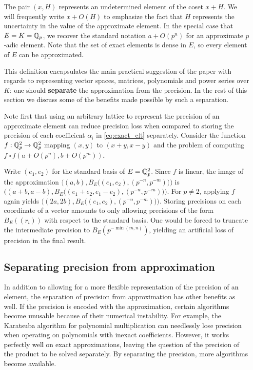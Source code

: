 \documentclass{lms}
\begin{document}
The pair $(x, H)$ represents an undetermined element of the coset
$x + H$.  We will frequently write $x + O(H)$ to emphasize the fact that $H$ represents
the uncertainty in the value of the approximate element.  In the special case that $E = K = \mathbb Q_p$,
we recover the standard notation $a + O(p^n)$ for an approximate $p$-adic element.
Note that the set of exact elements is dense in $E$, so every element of $E$ can be approximated.

This definition encapsulates the main practical suggestion of the paper with regards to representing
vector spaces, matrices, polynomials and power series over $K$: one should \textbf{separate} the
approximation from the precision.  In the rest of this section we discuss some of the benefits made
possible by such a separation.

Note first that using an arbitrary lattice to represent the precision of an approximate element
can reduce precision loss when compared to storing the precision of each coefficient
$\alpha_i$ in \eqref{eq:exact_elt} separately.  Consider the function 
$f : \mathbb Q_p^2 \to \mathbb Q_p^2$ mapping $(x,y)$ to $(x+y, x-y)$ and the problem of computing
$f \circ f(a + O(p^n), b + O(p^m))$.

Write $(e_1, e_2)$ for the standard basis of $E=\mathbb Q_p^2$.  Since $f$ is linear, the image of
the approximation $\bigl((a,b), B_E\bigl((e_1,e_2),(p^{-n}, p^{-m})\bigr)\bigr)$ is
$\bigl((a+b, a-b), B_E\bigl((e_1+e_2, e_1-e_2), (p^{-n}, p^{-m})\bigr)\bigr)$.
For $p \ne 2$, applying $f$ again yields $\bigl((2a, 2b), B_E\bigl((e_1, e_2), (p^{-n}, p^{-m})\bigr)\bigr)$.
Storing precisions on each coordinate of a vector amounts to only allowing precisions of the form
$B_E((r_i))$ with respect to the standard basis.  One would be forced to truncate the intermediate precision
to $B_E(p^{-\min(m, n)})$, yielding an artificial loss of precision in the final result.

\subsection{Separating precision from approximation}
\label{ssec:separation}

In addition to allowing for a more flexible representation of the precision of an element,
the separation of precision from approximation has other benefits as well.  If the precision
is encoded with the approximation, certain algorithms become unusable because of their
numerical instability.  For example, the Karatsuba algorithm for polynomial multiplication \cite{karatsuba-ofman:62a}
can needlessly lose precision when operating on polynomials with inexact coefficients.
However, it works perfectly well on exact approximations, leaving the question of the precision of
the product to be solved separately.  By separating the precision, more algorithms become available.
\end{document}
